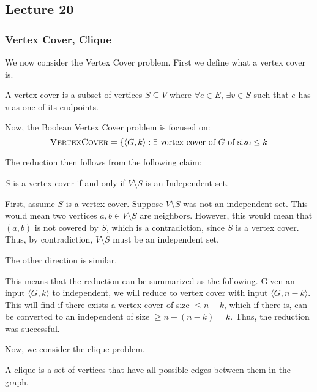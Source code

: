 \subsection{Lecture 20}
\subsubsection{Vertex Cover, Clique}

We now consider the Vertex Cover problem. First we define what a vertex cover is.

\begin{definition}
    A vertex cover is a subset of vertices $S \subseteq V$ where $\forall e \in E$, $\exists v \in S$ such that $e$ has $v$ as
    one of its endpoints.
\end{definition}

Now, the Boolean Vertex Cover problem is focused on:
\[ \textsc{VertexCover} = \{\langle G, k\rangle : \exists \text{ vertex cover of $G$ of size $\leq k$} \]

The reduction then follows from the following claim:
\begin{theorem}
    $S$ is a vertex cover if and only if $V \setminus S$ is an Independent set.
    \begin{proof*}
        First, assume $S$ is a vertex cover. Suppose $V \setminus S$ was not an independent set. This would mean two
        vertices $a, b \in V \setminus S$ are neighbors. However, this would mean that $(a, b)$ is not covered by $S$, which is a contradiction,
        since $S$ is a vertex cover. Thus, by contradiction, $V \setminus S$ must be an independent set.

        The other direction is similar.
    \end{proof*}
\end{theorem}

This means that the reduction can be summarized as the following. Given an input $\langle G, k \rangle$ to independent, we will reduce to vertex cover
with input $\langle G, n - k \rangle$. This will find if there exists a vertex cover of size $\leq n - k$, which if there is, can be converted
to an independent of size $\geq n - (n - k) = k$. Thus, the reduction was successful.

Now, we consider the clique problem.

\begin{definition}[Clique]
    A clique is a set of vertices that have all possible edges between them in the graph.
\end{definition}

